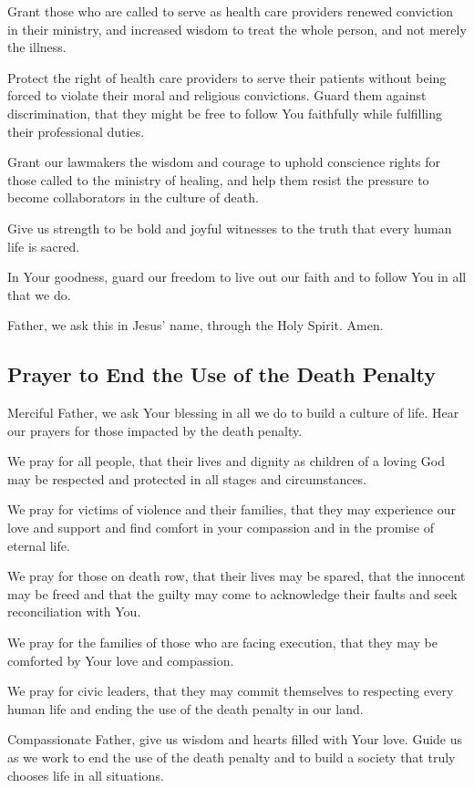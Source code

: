 \documentclass[12pt]{article}
\newcommand{\prayertitle}[1]{\subsection{#1}}
\begin{document}
Grant those who are called to serve as health care providers renewed conviction in their ministry, and increased wisdom to treat the whole person, and not merely the illness.

Protect the right of health care providers to serve their patients without being forced to violate their moral and religious convictions.
Guard them against discrimination, that they might be free to follow You faithfully while fulfilling their professional duties.

Grant our lawmakers the wisdom and courage to uphold conscience rights for those called to the ministry of healing, and help them resist the pressure to become collaborators in the culture of death.

Give us strength to be bold and joyful witnesses to the truth that every human life is sacred.

In Your goodness, guard our freedom to live out our faith and to follow You in all that we do.

Father, we ask this in Jesus’ name, through the Holy Spirit. Amen.

\prayertitle{Prayer to End the Use of the Death Penalty}
Merciful Father, we ask Your blessing in all we do to build a culture of life.
Hear our prayers for those impacted by the death penalty.

We pray for all people, that their lives and dignity as children of a loving God may be respected and protected in all stages and circumstances.

We pray for victims of violence and their families, that they may experience our love and support and find comfort in your compassion and in the promise of eternal life.

We pray for those on death row, that their lives may be spared, that the innocent may be freed and that the guilty may come to acknowledge their faults and seek reconciliation with You.

We pray for the families of those who are facing execution, that they may be comforted by Your love and compassion.

We pray for civic leaders, that they may commit themselves to respecting every human life and ending the use of the death penalty in our land.

Compassionate Father, give us wisdom and hearts filled with Your love.
Guide us as we work to end the use of the death penalty and to build a society that truly chooses life in all situations.
\end{document}
